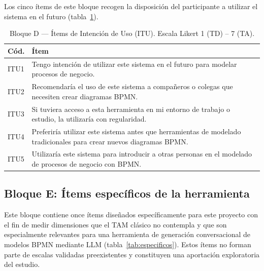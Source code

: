Los cinco ítems de este bloque recogen la disposición del participante a utilizar el sistema en el futuro (tabla~\ref{tab:itu}).

\begin{table}[htbp]
\centering
\caption{Bloque D --- Ítems de Intención de Uso (ITU). Escala Likert 1 (TD) -- 7 (TA).}
\label{tab:itu}
\begin{tabular}{@{} p{0.8cm} p{12cm} @{}}
\hline
\rule{0pt}{10pt}\textbf{Cód.} & \textbf{Ítem} \\
\hline
\rule{0pt}{10pt}ITU1 & Tengo intención de utilizar este sistema en el futuro para modelar procesos de negocio. \\[4pt]
ITU2 & Recomendaría el uso de este sistema a compañeros o colegas que necesiten crear diagramas BPMN. \\[4pt]
ITU3 & Si tuviera acceso a esta herramienta en mi entorno de trabajo o estudio, la utilizaría con regularidad. \\[4pt]
ITU4 & Preferiría utilizar este sistema antes que herramientas de modelado tradicionales para crear nuevos diagramas BPMN. \\[4pt]
ITU5 & Utilizaría este sistema para introducir a otras personas en el modelado de procesos de negocio con BPMN. \\[4pt]
\hline
\end{tabular}
\end{table}

\subsection{Bloque E: Ítems específicos de la herramienta}
\label{subsec:bloqueE}

Este bloque contiene once ítems diseñados específicamente para este proyecto con el fin de medir dimensiones que el TAM clásico no contempla y que son especialmente relevantes para una herramienta de generación conversacional de modelos BPMN mediante LLM (tabla~\ref{tab:especificos}). Estos ítems no forman parte de escalas validadas preexistentes y constituyen una aportación exploratoria del estudio.

